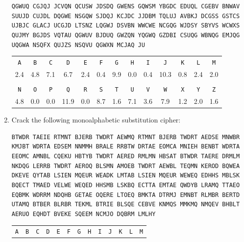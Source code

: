 \documentclass{book}
\theoremstyle{plain}
\theoremstyle{definition}
\newif\ifprintsolutions
\newcommand{\solution}[1]{\ifprintsolutions \begin{sloppypar}{\it #1}\end{sloppypar} \fi} %
\newcommand{\ciphertext}[1]{\texttt{#1}} %
\newcommand{\display}[1]{\begin{sloppypar}\setlength{\parindent}{0mm}#1\end{sloppypar}} %
\newcommand{\ciphertextspace}[1]{\begin{sloppypar}\doublespacing\Large\texttt{#1}\end{sloppypar}} %
\begin{document}
\begin{enumerate}
\display{\ciphertextspace{QGWUQ CGJQJ JCVQN QCUSW JDSDQ GWENS GQWSM YBGDC EDUQL CGEBV BNWAV SUUJD CUJDL DQGWE NSGQW SJDQJ KCJDC JJDBM TQLUJ AVBKJ DCGSS GSTCS UJBJC GLACJ UCGJD LTSNZ LQGWJ DSVBN WWCWE NCGQG WJDSY SBYVS WCWXS QUJMY BGJDS VQTAU QGWUV BJDUQ GWZQN YQGWQ GZDBI CSUQG WBNQG EMJQG UQGWA NSQFX QUJZS NSQVU QGWXN MCJAQ JU}}
\begin{center}
\begin{tabular}{ccccccccccccc}
\ciphertext{A} & \ciphertext{B} & \ciphertext{C} & \ciphertext{D} & \ciphertext{E} & \ciphertext{F} & \ciphertext{G} & \ciphertext{H} & \ciphertext{I} & \ciphertext{J} & \ciphertext{K} & \ciphertext{L} & \ciphertext{M} \\
2.4 & 4.8 & 7.1 & 6.7 & 2.4 & 0.4 & 9.9 & 0.0 & 0.4 & 10.3 & 0.8 & 2.4 & 2.0 \\
\\
\ciphertext{N} & \ciphertext{O} & \ciphertext{P} & \ciphertext{Q} & \ciphertext{R} & \ciphertext{S} & \ciphertext{T} & \ciphertext{U} & \ciphertext{V} & \ciphertext{W} & \ciphertext{X} & \ciphertext{Y} & \ciphertext{Z} \\
4.8 & 0.0 & 0.0 & 11.9 & 0.0 & 8.7 & 1.6 & 7.1 & 3.6 & 7.9 & 1.2 & 2.0 & 1.6
\end{tabular}
\end{center}
\solution{No keyword: And Saint Attila raised the hand grenade up on high, saying "O Lord, bless this thy hand grenade; that with it thou mayst blow thine enemies to tiny bits in thy mercy." And the Lord did grin, and the people did feast upon the lambs and sloths and carp and anchovies and orangutans and breakfast cereals and fruit-bats}
\item Crack the following monoalphabetic substitution cipher:
\display{\ciphertextspace{BTWDR TAEIE RTMNT BJERB TWDRT AEWMQ RTMNT BJERB TWDRT AEDSE MNWBR KMJBT WDRTA EDSEM NNMMH BRALE RRBTW DRTAE EOMCA MNIEH BENBT WDRTA EEOMC AMNBL CQEKU HBTYB TWDRT AERED RMLMN HBSAT BTWDR TAERE DRMLM NKDQG LERRB TWDRT AEROQ BLSMN AMOEB TWDRT AEWBL TEQMN KEROD BQWEA DKEVE QYTAB LSIEN MQEUR WEADK LMTAB LSIEN MQEUR WEWEQ EDHHS MBLSK BQECT TMAED VELWE WEQED HHSMB LSKBQ ECTTA EMTAE QWDYB LRAMQ TTAEO EQBMK WDRRM NDQHB GETAE OQERE LTOEQ BMKTA DTRMJ EMNBT RLMBR BERTD UTAMQ BTBER BLRBR TEKML BTRIE BLSQE CEBVE KNMQS MMKMQ NMQEV BHBLT AERUO EQHDT BVEKE SQEEM NCMJO DQBRM LMLHY}}
\begin{center}
\begin{tabular}{ccccccccccccc}
\ciphertext{A} & \ciphertext{B} & \ciphertext{C} & \ciphertext{D} & \ciphertext{E} & \ciphertext{F} & \ciphertext{G} & \ciphertext{H} & \ciphertext{I} & \ciphertext{J} & \ciphertext{K} & \ciphertext{L} & \ciphertext{M} \\

\end{tabular}
\end{center}
\end{enumerate}
\end{document}
